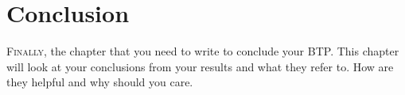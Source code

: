 \chapter{Conclusion}
\lettrine[lines=1]{F}{inally}, the chapter that you need to write to conclude your BTP. This chapter will look at your conclusions from your results and what they refer to. How are they helpful and why should you care.
